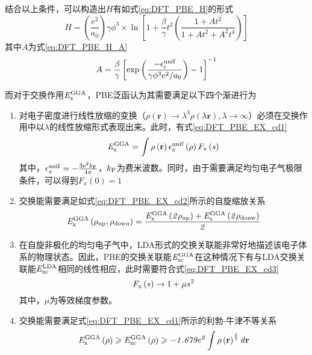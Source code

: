     结合以上条件，可以构造出$H$有如式\eqref{eq:DFT_PBE_H}的形式\chinesecolon
    \begin{equation}
        \label{eq:DFT_PBE_H}
        H=\left(\frac{e^2}{a_0}\right)\gamma\phi^3\times \ln\left[1+\frac{\beta}{\gamma}t^2\left(\frac{1+At^2}{1+At^2+A^2t^4}\right)\right]
    \end{equation}
    其中$A$为式\eqref{eq:DFT_PBE_H_A}\chinesecolon
    \begin{equation}
        \label{eq:DFT_PBE_H_A}
        A=\frac{\beta}{\gamma}\left[\exp\left(\frac{-\epsilon_{\rm c}^{\rm unif}}{\gamma\phi^3e^2/ a_0}\right)-1\right]^{-1}
    \end{equation}

而对于交换作用$\it E_{\rm x}^{\rm GGA} \it$，PBE泛函认为其需要满足以下四个渐进行为\chinesecolon
\begin{enumerate}[labelsep=0em,label=（\arabic*）,wide]
    \item 对电子密度进行线性放缩的变换（$\rho\left({\bm r}\right)\rightarrow \lambda^3\rho(\lambda {\bm r}), \lambda\rightarrow \infty$）必须在交换作用中以$\lambda$的线性放缩形式表现出来。此时，有式\eqref{eq:DFT_PBE_EX_cd1}\chinesecolon
    \begin{equation}
        \label{eq:DFT_PBE_EX_cd1}
        \it E_{\rm x}^{\rm GGA} \it=\int\rho\left({\mathbf r}\right)\epsilon_x^{\rm unif}\left(\rho\right)F_{\rm x}\left(s\right)
    \end{equation}
    其中，$\epsilon_x^{\rm unif}=-\frac{3e^2k_{\rm F}}{4\pi}$，$k_{\rm F}$为费米波数。同时，由于需要满足均匀电子气极限条件，可以得到$F_{x}\left(0\right)=1$
    \item 交换能需要满足如式\eqref{eq:DFT_PBE_EX_cd2}所示的自旋缩放关系\chinesecolon
    \begin{equation}
        \label{eq:DFT_PBE_EX_cd2}
        \it E_{\rm x}^{\rm GGA} \it\left(\rho_{\rm up},\rho_{\rm down}\right)=\frac{\it E_{\rm x}^{\rm GGA} \it\left(2\rho_{\rm up}\right)+\it E_{\rm x}^{\rm GGA} \it\left(2\rho_{\rm donw}\right)}{2}
    \end{equation}
    \item 在自旋非极化的均匀电子气中，LDA形式的交换关联能非常好地描述该电子体系的物理状态。因此，PBE的交换关联能$\it E_{\rm xc}^{\rm GGA} \it$在这种情况下有与LDA交换关联能$\it E_{\rm xc}^{\rm LDA} \it$相同的线性相应，此时需要符合式\eqref{eq:DFT_PBE_EX_cd3}\chinesecolon
    \begin{equation}
        \label{eq:DFT_PBE_EX_cd3}
        F_{\rm x}\left(s\right)\rightarrow 1+\mu s^2
    \end{equation}
    其中，$\mu$为等效梯度参数。
    \item 交换能需要满足式\eqref{eq:DFT_PBE_EX_cd1}所示的利勃-牛津不等关系\chinesecolon
    \begin{equation}
        \label{eq:DFT_PBE_EX_cd4}
        \it E_{\rm x}^{\rm GGA} \it\left(\rho\right)\geqslant\it E_{\rm xc}^{\rm GGA} \it\left(\rho\right)\geqslant -1.679e^2\int \rho\left({\mathbf r}\right)^{\frac{4}{3}} d{\mathbf r}
    \end{equation}
\end{enumerate}

